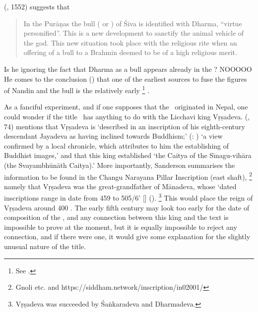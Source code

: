 \documentclass[11pt]{book}
\begin{document}
\citeauthor{bhattacharya_nandin_1977} (\citeyear{bhattacharya_nandin_1977}, {1552}) suggests that

\begin{quote}
{\footnotesize
In the Purāṇas the bull 
( or 
) 
of Śiva is identified with Dharma, ``virtue personified''. 
This is a new development to sanctify the animal 
vehicle of the god. This new situation took place with the religious 
rite when an offering of a bull to a Brahmin deemed to be
of a high religious merit.
}
\end{quote}

\noindent
Is he ignoring the fact that Dharma as
a bull appears already in the \MBh? NOOOOO
\label{nandi_not_bull}He comes to the conclusion
()
that one of the earliest sources to fuse the figures
of Nandin and the bull is the relatively early%
		\footnote{See .}
\MatsP.


As a fanciful experiment, and if one supposes that the 
\VSS\ originated in Nepal, one could wonder if the 
title \Vss\ has anything to do with the Licchavi king
Vṛṣadeva.
\citeauthor{SandersonSaivaAge} 
(\citeyear{SandersonSaivaAge}, 74) mentions that  
Vṛṣadeva is `described in an inscription of his eighth-century 
descendant Jayadeva as having inclined towards Buddhism;'
(: 
) 
`a view conﬁrmed by a local chronicle, which attributes to
him the establishing of Buddhist images,'
and that this king established 
`the Caitya of the Sı̄nagu-vihāra (the Svayambhūnāth Caitya).'
More importantly, Sanderson summarises the 
information to be found in the 
Changu Narayana Pillar Inscription (east shaft),%
		\footnote{Gnoli etc. and 
		https://siddham.network/inscription/in02001/} 
namely that Vṛṣadeva was the great-grandfather of Mānadeva, whose
`dated inscriptions range in date from 459 to 505/6' [\CE]
().%
	   \footnote{Vṛṣadeva was succeeded by Śaṅkaradeva and
	   		            Dharmadeva.}
This would place 
the reign of Vṛṣadeva around 400 \CE. 
The early fifth century may look too early for the date of composition
of the \Vss, and any connection between this king
and the text is impossible to prove at the moment, 
but it is equally impossible to reject any connection, 
and if there were one, it would give some explanation for the slightly
unusual nature of the title.
\hide{
}
\end{document}
